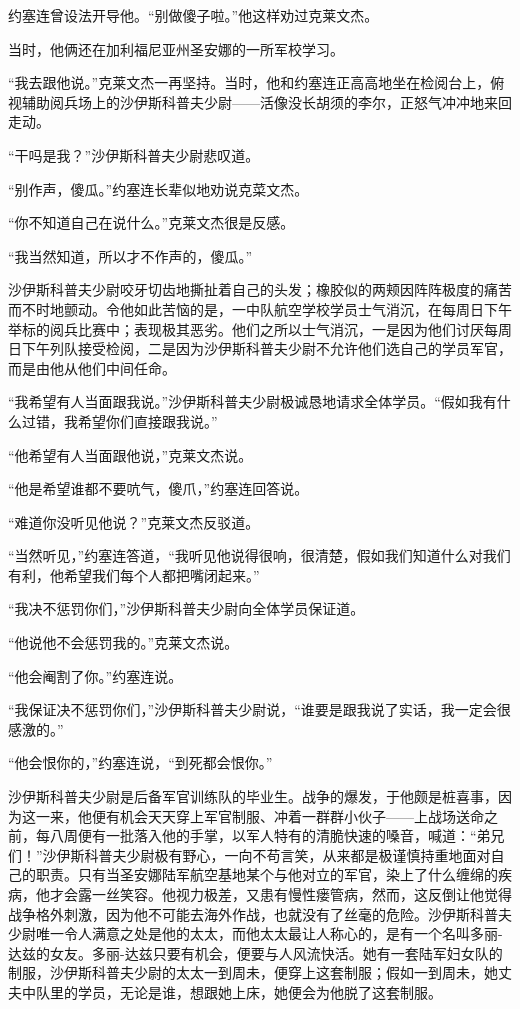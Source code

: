     约塞连曾设法开导他。“别做傻子啦。”他这样劝过克莱文杰。

    当时，他俩还在加利福尼亚州圣安娜的一所军校学习。

    “我去跟他说。”克莱文杰一再坚持。当时，他和约塞连正高高地坐在检阅台上，俯视辅助阅兵场上的沙伊斯科普夫少尉——活像没长胡须的李尔，正怒气冲冲地来回走动。

    “干吗是我？”沙伊斯科普夫少尉悲叹道。

    “别作声，傻瓜。”约塞连长辈似地劝说克菜文杰。

    “你不知道自己在说什么。”克莱文杰很是反感。

    “我当然知道，所以才不作声的，傻瓜。”

    沙伊斯科普夫少尉咬牙切齿地撕扯着自己的头发；橡胶似的两颊因阵阵极度的痛苦而不时地颤动。令他如此苦恼的是，一中队航空学校学员士气消沉，在每周日下午举标的阅兵比赛中；表现极其恶劣。他们之所以士气消沉，一是因为他们讨厌每周日下午列队接受检阅，二是因为沙伊斯科普夫少尉不允许他们选自己的学员军官，而是由他从他们中间任命。

    “我希望有人当面跟我说。”沙伊斯科普夫少尉极诚恳地请求全体学员。“假如我有什么过错，我希望你们直接跟我说。”

    “他希望有人当面跟他说，”克莱文杰说。

    “他是希望谁都不要吭气，傻爪，”约塞连回答说。

    “难道你没听见他说？”克莱文杰反驳道。

    “当然听见，”约塞连答道，“我听见他说得很响，很清楚，假如我们知道什么对我们有利，他希望我们每个人都把嘴闭起来。”

    “我决不惩罚你们，”沙伊斯科普夫少尉向全体学员保证道。

    “他说他不会惩罚我的。”克莱文杰说。

    “他会阉割了你。”约塞连说。

    “我保证决不惩罚你们，”沙伊斯科普夫少尉说，“谁要是跟我说了实话，我一定会很感激的。”

    “他会恨你的，”约塞连说，“到死都会恨你。”

    沙伊斯科普夫少尉是后备军官训练队的毕业生。战争的爆发，于他颇是桩喜事，因为这一来，他便有机会天天穿上军官制服、冲着一群群小伙子——上战场送命之前，每八周便有一批落入他的手掌，以军人特有的清脆快速的嗓音，喊道：“弟兄们！”沙伊斯科普夫少尉极有野心，一向不苟言笑，从来都是极谨慎持重地面对自己的职责。只有当圣安娜陆军航空基地某个与他对立的军官，染上了什么缠绵的疾病，他才会露一丝笑容。他视力极差，又患有慢性瘘管病，然而，这反倒让他觉得战争格外刺激，因为他不可能去海外作战，也就没有了丝毫的危险。沙伊斯科普夫少尉唯一令人满意之处是他的太太，而他太太最让人称心的，是有一个名叫多丽-达兹的女友。多丽-达兹只要有机会，便要与人风流快活。她有一套陆军妇女队的制服，沙伊斯科普夫少尉的太太一到周未，便穿上这套制服；假如一到周未，她丈夫中队里的学员，无论是谁，想跟她上床，她便会为他脱了这套制服。

